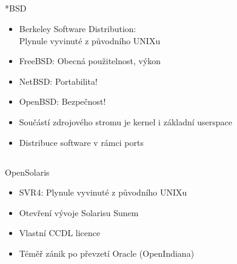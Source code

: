 \documentclass{beamer}
\begin{document}
\subsection{}
\begin{frame}{*BSD}
\begin{itemize}
\item Berkeley Software Distribution: \\ Plynule vyvinuté z původního UNIXu
\item FreeBSD: Obecná použitelnost, výkon
\item NetBSD: Portabilita!
\item OpenBSD: Bezpečnost!
\item Součástí zdrojového stromu je kernel i základní userspace
\item Distribuce software v rámci ports
\end{itemize}
\end{frame}

\subsection{}
\begin{frame}{OpenSolaris}
\begin{itemize}
\item SVR4: Plynule vyvinuté z původního UNIXu
\item Otevření vývoje Solarisu Sunem
\item Vlastní CCDL licence
\item Téměř zánik po převzetí Oracle (OpenIndiana)
\end{itemize}
\end{frame}
\end{document}
